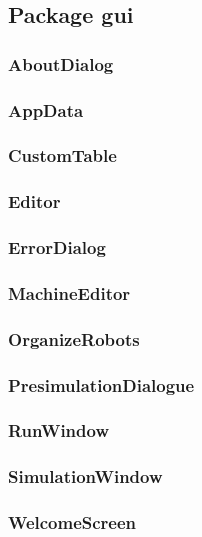 \documentclass[%
  a4paper,%
  11pt,%
  blue,%
  hyperref	%
  ]{tubsartcl}
\begin{document}
\subsection{Package gui}

\subsubsection{AboutDialog}

\subsubsection{AppData}

\subsubsection{CustomTable}

\subsubsection{Editor}

\subsubsection{ErrorDialog}

\subsubsection{MachineEditor}

\subsubsection{OrganizeRobots}

\subsubsection{PresimulationDialogue}

\subsubsection{RunWindow}

\subsubsection{SimulationWindow}

\subsubsection{WelcomeScreen}
\end{document}
